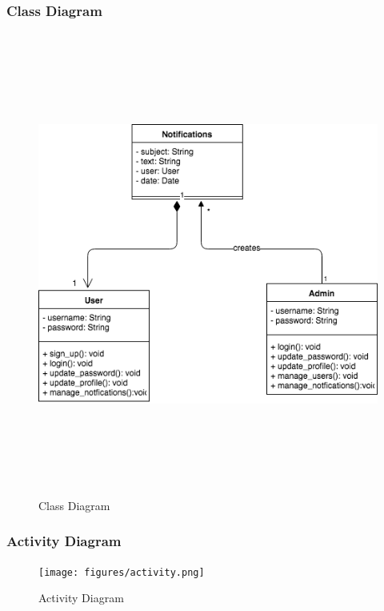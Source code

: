 \documentclass[12pt,a4paper]{article}
\begin{document}
    	\subsubsection{Class Diagram}
    	\begin{figure}[H]
    		\centering
    		\includegraphics[width=\textwidth,height=6in]{figures/class_diagram.png}
    		\caption{Class Diagram}
    	\end{figure}
	    
	    \subsubsection{Activity Diagram}
	    \begin{figure}[H]
    		\centering
    		\texttt{[image: figures/activity.png]}
    		\caption{Activity Diagram}
    	\end{figure}
    	
\end{document}
